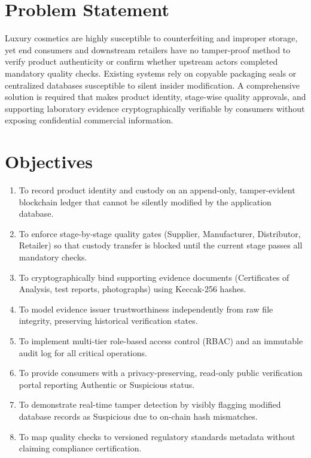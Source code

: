 \documentclass[12pt,a4paper]{report}
\begin{document}
\section{Problem Statement}
Luxury cosmetics are highly susceptible to counterfeiting and improper storage, yet end consumers and downstream retailers have no tamper-proof method to verify product authenticity or confirm whether upstream actors completed mandatory quality checks. Existing systems rely on copyable packaging seals or centralized databases susceptible to silent insider modification. A comprehensive solution is required that makes product identity, stage-wise quality approvals, and supporting laboratory evidence cryptographically verifiable by consumers without exposing confidential commercial information.

\section{Objectives}
\begin{enumerate}[leftmargin=1.5em]
    \item To record product identity and custody on an append-only, tamper-evident blockchain ledger that cannot be silently modified by the application database.
    \item To enforce stage-by-stage quality gates (Supplier, Manufacturer, Distributor, Retailer) so that custody transfer is blocked until the current stage passes all mandatory checks.
    \item To cryptographically bind supporting evidence documents (Certificates of Analysis, test reports, photographs) using Keccak-256 hashes.
    \item To model evidence issuer trustworthiness independently from raw file integrity, preserving historical verification states.
    \item To implement multi-tier role-based access control (RBAC) and an immutable audit log for all critical operations.
    \item To provide consumers with a privacy-preserving, read-only public verification portal reporting Authentic or Suspicious status.
    \item To demonstrate real-time tamper detection by visibly flagging modified database records as Suspicious due to on-chain hash mismatches.
    \item To map quality checks to versioned regulatory standards metadata without claiming compliance certification.
\end{enumerate}
\end{document}
